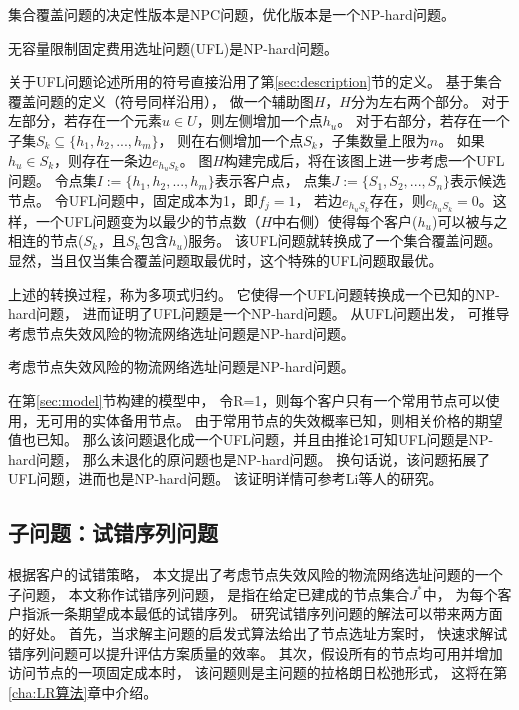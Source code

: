 \begin{description}[leftmargin=0pt, topsep=0pt, parsep=0pt]
  \item[引理 1] 集合覆盖问题的决定性版本是NPC问题，优化版本是一个NP-hard问题。
  \item[推论 1] 无容量限制固定费用选址问题(UFL)是NP-hard问题。
  \item[证明 1] 关于UFL问题论述所用的符号直接沿用了第\ref{sec:description}节的定义。
  基于集合覆盖问题的定义（符号同样沿用），
  做一个辅助图$H$，$H$分为左右两个部分。
  对于左部分，若存在一个元素$u\in U$，则左侧增加一个点$h_u$。
  对于右部分，若存在一个子集$S_k \subseteq \{h_1, h_2, ... , h_m\}$，
  则在右侧增加一个点$S_k$，子集数量上限为$n$。
  如果$h_u \in S_k $，则存在一条边$e_{h_uS_k}$。
  图$H$构建完成后，将在该图上进一步考虑一个UFL问题。
  令点集$I:=\{h_1, h_2, ... ,h_m\}$表示客户点，
  点集$J:=\{S_1, S_2,...,S_n\}$表示候选节点。
  令UFL问题中，固定成本为1，即$f_j=1$，
  若边$e_{h_uS_k}$存在，则$c_{h_uS_k}=0$。这样，一个UFL问题变为以最少的节点数（$H$中右侧）使得每个客户($h_u$)可以被与之相连的节点($S_k$，且$S_k$包含$h_u$)服务。
  该UFL问题就转换成了一个集合覆盖问题。
  显然，当且仅当集合覆盖问题取最优时，这个特殊的UFL问题取最优。
\end{description}

上述的转换过程，称为多项式归约。
它使得一个UFL问题转换成一个已知的NP-hard问题，
进而证明了UFL问题是一个NP-hard问题。
从UFL问题出发，
可推导考虑节点失效风险的物流网络选址问题是NP-hard问题。

\begin{description}[leftmargin=0pt, topsep=0pt, parsep=0pt]
  \item[推论 2] 考虑节点失效风险的物流网络选址问题是NP-hard问题。
  \item[证明 2] 在第\ref{sec:model}节构建的模型中，
  令R=1，则每个客户只有一个常用节点可以使用，无可用的实体备用节点。
  由于常用节点的失效概率已知，则相关价格的期望值也已知。
  那么该问题退化成一个UFL问题，并且由推论1可知UFL问题是NP-hard问题，
  那么未退化的原问题也是NP-hard问题。
  换句话说，该问题拓展了UFL问题，进而也是NP-hard问题。
  该证明详情可参考Li\cite{qingwei}等人的研究。
\end{description}


\subsection{子问题：试错序列问题}
\label{subsec:subprob}
根据客户的试错策略，
本文提出了考虑节点失效风险的物流网络选址问题的一个子问题，
本文称作试错序列问题，
是指在给定已建成的节点集合$J^*$中，
为每个客户指派一条期望成本最低的试错序列。
研究试错序列问题的解法可以带来两方面的好处。
首先，当求解主问题的启发式算法给出了节点选址方案时，
快速求解试错序列问题可以提升评估方案质量的效率。
其次，假设所有的节点均可用并增加访问节点的一项固定成本时，
该问题则是主问题的拉格朗日松弛形式，
这将在第\ref{cha:LR算法}章中介绍。

